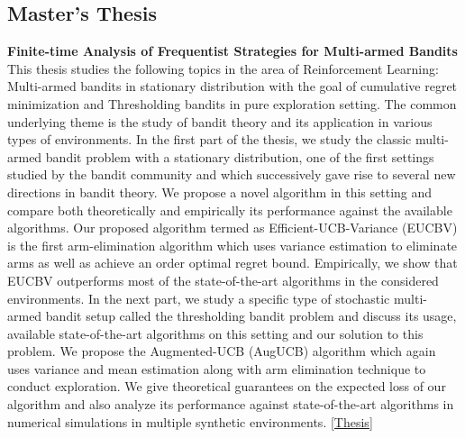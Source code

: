 \documentclass[margin,11pt]{res}
\begin{document}
\begin{resume}
\section{Master's Thesis}
\textbf{Finite-time Analysis of Frequentist Strategies for Multi-armed Bandits}\\
This thesis studies the following topics in the area of Reinforcement Learning: Multi-armed bandits in stationary distribution with the goal of cumulative regret minimization and Thresholding bandits in pure exploration setting. The common underlying theme is the study of bandit theory and its application in various types of environments. In the first part of the thesis, we study the classic multi-armed bandit problem with a stationary distribution, one of the first settings studied by the bandit community and which successively gave rise to several new directions in bandit theory. We propose a novel algorithm in this setting and compare both theoretically and empirically its performance against the available algorithms. Our proposed algorithm termed as Efficient-UCB-Variance (EUCBV) is the first arm-elimination algorithm which uses variance estimation to eliminate arms as well as achieve an order optimal regret bound. Empirically, we show that EUCBV outperforms most of the state-of-the-art algorithms in the considered environments. In the next part, we study a specific type of stochastic multi-armed bandit setup called the thresholding bandit problem and discuss its usage, available state-of-the-art algorithms on this setting and our solution to this problem. We propose the Augmented-UCB (AugUCB) algorithm which again uses variance and mean estimation along with arm elimination technique to conduct exploration. We give theoretical guarantees on the expected loss of our algorithm and also analyze its performance against state-of-the-art algorithms in numerical simulations in multiple synthetic environments. \href{https://subhojyoti.github.io/pdf/final_thesis(A5)_Subhojyoti_CS15S300.pdf}{[Thesis]}


%




\end{resume}
\end{document}

